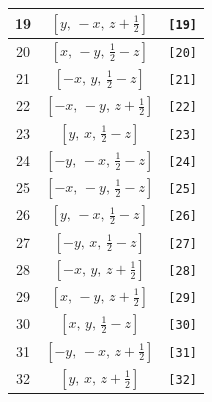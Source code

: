 \documentclass[fleqn,8pt]{jsarticle}
\begin{document}
\begin{longtable}{ccc}
19 & $\left[ y,\, - x,\, z + \frac{1}{2} \right]$ & {\tt [19]} \\ \hline
20 & $\left[ x,\, - y,\, \frac{1}{2} - z \right]$ & {\tt [20]} \\ \hline
21 & $\left[ - x,\, y,\, \frac{1}{2} - z \right]$ & {\tt [21]} \\ \hline
22 & $\left[ - x,\, - y,\, z + \frac{1}{2} \right]$ & {\tt [22]} \\ \hline
23 & $\left[ y,\, x,\, \frac{1}{2} - z \right]$ & {\tt [23]} \\ \hline
24 & $\left[ - y,\, - x,\, \frac{1}{2} - z \right]$ & {\tt [24]} \\ \hline
25 & $\left[ - x,\, - y,\, \frac{1}{2} - z \right]$ & {\tt [25]} \\ \hline
26 & $\left[ y,\, - x,\, \frac{1}{2} - z \right]$ & {\tt [26]} \\ \hline
27 & $\left[ - y,\, x,\, \frac{1}{2} - z \right]$ & {\tt [27]} \\ \hline
28 & $\left[ - x,\, y,\, z + \frac{1}{2} \right]$ & {\tt [28]} \\ \hline
29 & $\left[ x,\, - y,\, z + \frac{1}{2} \right]$ & {\tt [29]} \\ \hline
30 & $\left[ x,\, y,\, \frac{1}{2} - z \right]$ & {\tt [30]} \\ \hline
31 & $\left[ - y,\, - x,\, z + \frac{1}{2} \right]$ & {\tt [31]} \\ \hline
32 & $\left[ y,\, x,\, z + \frac{1}{2} \right]$ & {\tt [32]} \\
\end{longtable}
\end{document}
